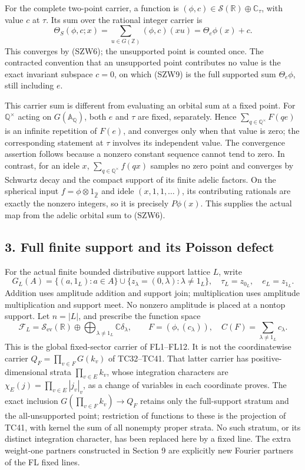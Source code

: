 \documentclass[
  10pt,
  a4paper,
]{article}
\newcounter{none} %
\begin{document}
For the complete two-point carrier, a function is
\((\phi,c)\in\mathcal S(\mathbb R)\oplus\mathbb C_\tau\), with value
\(c\) at \(\tau\). Its sum over the rational integer carrier is \[
\Theta_S(\phi,c;x)=\sum_{u\in G(\mathbb Z)}(\phi,c)(xu)
=\Theta_e\phi(x)+c.
\tag{SZW9}
\] This converges by (SZW6); the unsupported point is counted once. The
contracted convention that an unsupported point contributes no value is
the exact invariant subspace \(c=0\), on which (SZW9) is the full
supported sum \(\Theta_e\phi\), still including \(e\).

This carrier sum is different from evaluating an orbital sum at a fixed
point. For \(\mathbb Q^\times\) acting on \(G(\mathbb A_{\mathbb Q})\),
both \(e\) and \(\tau\) are fixed, separately. Hence
\(\sum_{q\in\mathbb Q^\times}F(qe)\) is an infinite repetition of
\(F(e)\), and converges only when that value is zero; the corresponding
statement at \(\tau\) involves its independent value. The convergence
assertion follows because a nonzero constant sequence cannot tend to
zero. In contrast, for an idele \(x\),
\(\sum_{q\in\mathbb Q^\times}f(qx)\) samples no zero point and converges
by Schwartz decay and the compact support of its finite adelic factors.
On the spherical input \(f=\phi\otimes1_{\widehat{\mathbb Z}}\) and
idele \((x,1,1,\ldots)\), its contributing rationals are exactly the
nonzero integers, so it is precisely \(P\phi(x)\). This supplies the
actual map from the adelic orbital sum to (SZW6).

\subsection{3. Full finite support and its Poisson
defect}\label{full-finite-support-and-its-poisson-defect}

For the actual finite bounded distributive support lattice \(L\), write
\[
G_L(A)=\{(a,1_L):a\in A\}\cup\{z_\lambda=(0,\lambda):\lambda\ne1_L\},
\quad \tau_L=z_{0_L},\quad e_L=z_{1_L}.
\tag{SZW10}
\] Addition uses amplitude addition and support join; multiplication
uses amplitude multiplication and support meet. No nonzero amplitude is
placed at a nontop support. Let \(n=|L|\), and prescribe the function
space \[
\mathcal F_L=\mathcal S_{\mathrm{ev}}(\mathbb R)
\oplus\bigoplus_{\lambda\ne1_L}\mathbb C\delta_\lambda,
\qquad F=(\phi,(c_\lambda)),\quad C(F)=\sum_{\lambda\ne1_L}c_\lambda.
\tag{SZW11}
\] This is the global fixed-sector carrier of FL1--FL12. It is not the
coordinatewise carrier \(Q_F=\prod_{v\in F}G(k_v)\) of TC32--TC41. That
latter carrier has positive-dimensional strata \(\prod_{v\in E}k_v\),
whose integration characters are \(\chi_E(j)=\prod_{v\in E}|j_v|_v\), as
a change of variables in each coordinate proves. The exact inclusion
\(G(\prod_{v\in F}k_v)\to Q_F\) retains only the full-support stratum
and the all-unsupported point; restriction of functions to these is the
projection of TC41, with kernel the sum of all nonempty proper strata.
No such stratum, or its distinct integration character, has been
replaced here by a fixed line. The extra weight-one partners constructed
in Section 9 are explicitly new Fourier partners of the FL fixed lines.
\end{document}
